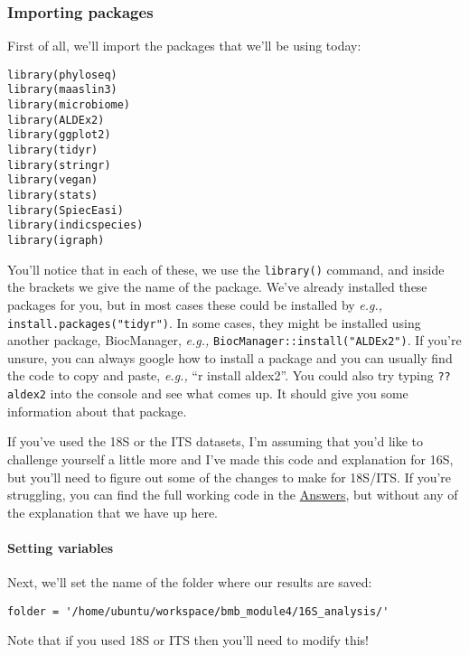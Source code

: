 \documentclass[
]{book}
\begin{document}
\subsubsection{Importing packages}\label{importing-packages}

First of all, we'll import the packages that we'll be using today:

\begin{verbatim}
library(phyloseq)
library(maaslin3)
library(microbiome)
library(ALDEx2)
library(ggplot2)
library(tidyr)
library(stringr)
library(vegan)
library(stats)
library(SpiecEasi)
library(indicspecies)
library(igraph)
\end{verbatim}

You'll notice that in each of these, we use the \texttt{library()} command, and inside the brackets we give the name of the package. We've already installed these packages for you, but in most cases these could be installed by \emph{e.g.,} \texttt{install.packages("tidyr")}. In some cases, they might be installed using another package, BiocManager, \emph{e.g.,} \texttt{BiocManager::install("ALDEx2")}. If you're unsure, you can always google how to install a package and you can usually find the code to copy and paste, \emph{e.g.,} ``r install aldex2''. You could also try typing \texttt{??aldex2} into the console and see what comes up. It should give you some information about that package.

If you've used the 18S or the ITS datasets, I'm assuming that you'd like to challenge yourself a little more and I've made this code and explanation for 16S, but you'll need to figure out some of the changes to make for 18S/ITS. If you're struggling, you can find the full working code in the \hyperref[answers]{Answers}, but without any of the explanation that we have up here.

\paragraph{Setting variables}\label{setting-variables}

Next, we'll set the name of the folder where our results are saved:

\begin{verbatim}
folder = '/home/ubuntu/workspace/bmb_module4/16S_analysis/'
\end{verbatim}

Note that if you used 18S or ITS then you'll need to modify this!
\end{document}
